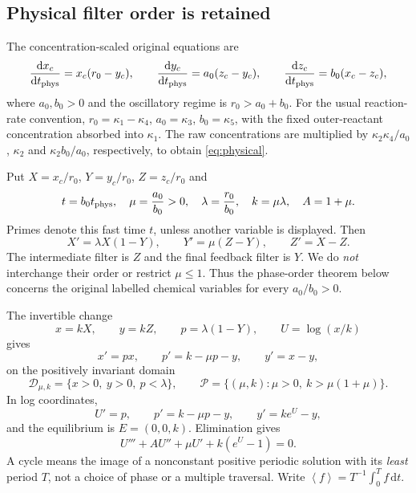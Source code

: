 \documentclass[11pt,a4paper]{article}
\numberwithin{equation}{section}
\theoremstyle{remark}\newtheorem{remark}[theorem]{Remark}
\newcommand{\avg}[1]{\left\langle #1\right\rangle}
\newcommand{\dd}{\,\mathrm dt}
\newcommand{\cP}{\mathcal P}
\begin{document}
\subsection{Physical filter order is retained}
The concentration-scaled original equations are
\begin{equation}\label{eq:physical}
\frac{\mathrm dx_c}{\mathrm dt_{\rm phys}}=x_c(r_0-y_c),\qquad
\frac{\mathrm dy_c}{\mathrm dt_{\rm phys}}=a_0(z_c-y_c),\qquad
\frac{\mathrm dz_c}{\mathrm dt_{\rm phys}}=b_0(x_c-z_c),
\end{equation}
where $a_0,b_0>0$ and the oscillatory regime is $r_0>a_0+b_0$.
For the usual reaction-rate convention, $r_0=\kappa_1-\kappa_4$, $a_0=\kappa_3$, $b_0=\kappa_5$, with the fixed outer-reactant concentration absorbed into $\kappa_1$. The raw concentrations are multiplied by $\kappa_2\kappa_4/a_0$, $\kappa_2$ and $\kappa_2b_0/a_0$, respectively, to obtain \eqref{eq:physical}.

Put $X=x_c/r_0$, $Y=y_c/r_0$, $Z=z_c/r_0$ and
\begin{equation}\label{eq:parameters}
t=b_0t_{\rm phys},\quad \mu=\frac{a_0}{b_0}>0,\quad
\lambda=\frac{r_0}{b_0},\quad k=\mu\lambda,\quad A=1+\mu.
\end{equation}
Primes denote this fast time $t$, unless another variable is displayed. Then
\begin{equation}\label{eq:filters}
X'=\lambda X(1-Y),\qquad Y'=\mu(Z-Y),\qquad Z'=X-Z.
\end{equation}
The intermediate filter is $Z$ and the final feedback filter is $Y$. We do \emph{not} interchange their order or restrict $\mu\le1$. Thus the phase-order theorem below concerns the original labelled chemical variables for every $a_0/b_0>0$.

The invertible change
\begin{equation}\label{eq:change}
x=kX,\qquad y=kZ,\qquad p=\lambda(1-Y),\qquad U=\log(x/k)
\end{equation}
gives
\begin{equation}\label{eq:system}
x'=px,\qquad p'=k-\mu p-y,\qquad y'=x-y,
\end{equation}
on the positively invariant domain
\[
\mathcal D_{\mu,k}=\{x>0,\ y>0,\ p<\lambda\},\qquad
\cP=\{(\mu,k):\mu>0,\ k>\mu(1+\mu)\}.
\]
In log coordinates,
\begin{equation}\label{eq:logsystem}
U'=p,\qquad p'=k-\mu p-y,\qquad y'=ke^U-y,
\end{equation}
and the equilibrium is $E=(0,0,k)$. Elimination gives
\begin{equation}\label{eq:scalar}
U'''+AU''+\mu U'+k(e^U-1)=0.
\end{equation}
A cycle means the image of a nonconstant positive periodic solution with its \emph{least} period $T$, not a choice of phase or a multiple traversal. Write $\avg f=T^{-1}\int_0^T f\dd$.
\end{document}

